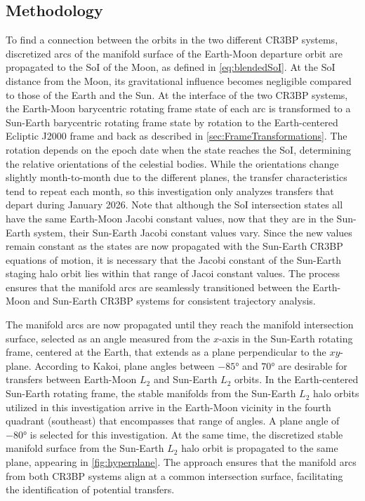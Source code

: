 \subsection{Methodology}
To find a connection between the orbits in the two different CR3BP systems, discretized arcs of the
manifold surface of the Earth-Moon departure orbit are propagated to the SoI of the Moon, as
defined in \cref{eq:blendedSoI}. At the SoI distance from the Moon, its gravitational influence
becomes negligible compared to those of the Earth and the Sun. At the interface of the two CR3BP
systems, the Earth-Moon barycentric rotating frame state of each arc is transformed to a Sun-Earth
barycentric rotating frame state by rotation to the Earth-centered Ecliptic J2000 frame and back as
described in \cref{sec:FrameTransformations}. The rotation depends on the epoch date when the state
reaches the SoI, determining the relative orientations of the celestial bodies. While the
orientations change slightly month-to-month due to the different planes, the transfer
characteristics tend to repeat each month, so this investigation only analyzes transfers that
depart during January 2026\cite{Parker:2013}. Note that although the SoI intersection states all
have the same Earth-Moon Jacobi constant values, now that they are in the Sun-Earth system, their
Sun-Earth Jacobi constant values vary. Since the new values remain constant as the states are now
propagated with the Sun-Earth CR3BP equations of motion, it is necessary that the Jacobi constant
of the Sun-Earth staging halo orbit lies within that range of Jacoi constant values. The process
ensures that the manifold arcs are seamlessly transitioned between the Earth-Moon and Sun-Earth
CR3BP systems for consistent trajectory analysis.

The manifold arcs are now propagated until they reach the manifold intersection surface, selected
as an angle measured from the $x$-axis in the Sun-Earth rotating frame, centered at the Earth, that
extends as a plane perpendicular to the $xy$-plane. According to Kakoi, plane angles between
$-\ang{85}$ and $\ang{70}$ are desirable for transfers between Earth-Moon $L_{2}$ and Sun-Earth
$L_{2}$ orbits\cite{Kakoi:2015}. In the Earth-centered Sun-Earth rotating frame, the stable
manifolds from the Sun-Earth $L_{2}$ halo orbits utilized in this investigation arrive in the
Earth-Moon vicinity in the fourth quadrant (southeast) that encompasses that range of angles. A
plane angle of $\ang{-80}$ is selected for this investigation. At the same time, the discretized
stable manifold surface from the Sun-Earth $L_{2}$ halo orbit is propagated to the same plane,
appearing in \cref{fig:hyperplane}. The approach ensures that the manifold arcs from both CR3BP
systems align at a common intersection surface, facilitating the identification of potential
transfers.

